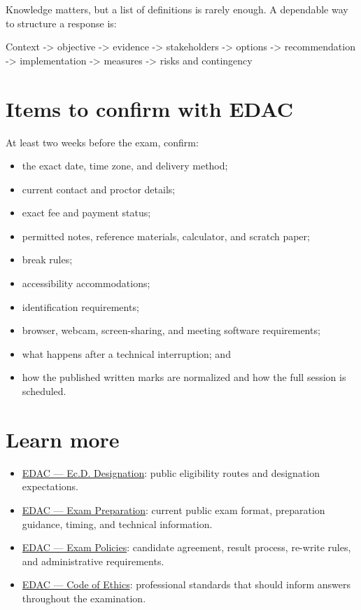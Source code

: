 \documentclass[11pt,letterpaper,oneside,openany]{book}
\newif\ifsectionhasicon
\newcommand{\currentsectionicon}{}
\newcommand{\marginsection}[2]{%
  \begingroup
  \sectionhasicontrue
  \def\currentsectionicon{#1}%
  \section[#2]{#2}%
  \endgroup
}
\begin{document}
Knowledge matters, but a list of definitions is rarely enough. A dependable way to structure a response is:


\begin{guidequote}
Context -\textgreater{} objective -\textgreater{} evidence -\textgreater{} stakeholders -\textgreater{} options -\textgreater{} recommendation -\textgreater{} implementation -\textgreater{} measures -\textgreater{} risks and contingency

\end{guidequote}


\section[Items to confirm with EDAC]{Items to confirm with EDAC}
At least two weeks before the exam, confirm:


\begin{itemize}
\item the exact date, time zone, and delivery method;
\item current contact and proctor details;
\item exact fee and payment status;
\item permitted notes, reference materials, calculator, and scratch paper;
\item break rules;
\item accessibility accommodations;
\item identification requirements;
\item browser, webcam, screen-sharing, and meeting software requirements;
\item what happens after a technical interruption; and
\item how the published written marks are normalized and how the full session is scheduled.
\end{itemize}


\marginsection{external-link}{Learn more}
\begin{itemize}
\item \href{https://edac.ca/professional-development/ecd-designation/}{EDAC --- Ec.D. Designation}: public eligibility routes and designation expectations.
\item \href{https://exam.edac.ca/exam-prep/}{EDAC --- Exam Preparation}: current public exam format, preparation guidance, timing, and technical information.
\item \href{https://exam.edac.ca/policies/}{EDAC --- Exam Policies}: candidate agreement, result process, re-write rules, and administrative requirements.
\item \href{https://edac.ca/about/code-of-ethics/}{EDAC --- Code of Ethics}: professional standards that should inform answers throughout the examination.
\end{itemize}
\end{document}
